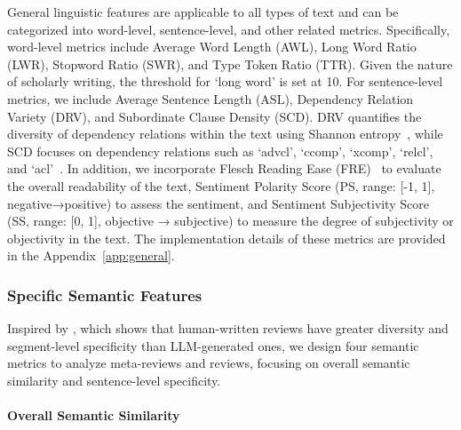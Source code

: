General linguistic features are applicable to all types of text and can be categorized into word-level, sentence-level, and other related metrics.
Specifically, word-level metrics include Average Word Length (AWL), Long Word Ratio (LWR), Stopword Ratio (SWR), and Type Token Ratio (TTR). Given the nature of scholarly writing, the threshold for `long word' is set at 10. 
For sentence-level metrics, we include Average Sentence Length (ASL), Dependency Relation Variety (DRV), and Subordinate Clause Density (SCD).
DRV quantifies the diversity of dependency relations within the text using Shannon entropy~\cite{lin1991divergence}, while SCD focuses on dependency relations such as `advcl', `ccomp', `xcomp', `relcl', and `acl'~\cite{nivre-etal-2017-universal}.
In addition, we incorporate Flesch Reading Ease (FRE)~\cite{farr1951simplification} to evaluate the overall readability of the text, Sentiment Polarity Score (PS, range: [-1, 1], negative→positive) to assess the sentiment, and Sentiment Subjectivity Score (SS, range: [0, 1], objective → subjective) to measure the degree of subjectivity or objectivity in the text. The implementation details of these metrics are provided in the Appendix~\ref{app:general}.



\subsubsection{Specific Semantic Features}
Inspired by \citet{du-etal-2024-llms}, which shows that human-written reviews have greater diversity and segment-level specificity than LLM-generated ones, we design four semantic metrics to analyze meta-reviews and reviews, focusing on overall semantic similarity and sentence-level specificity.






\paragraph{Overall Semantic Similarity}

